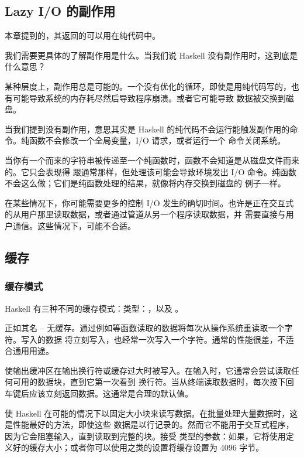 \documentclass[./main.tex]{subfiles}
\begin{document}
\subsection*{Lazy I/O 的副作用}

本章提到的，其返回的可以用在纯代码中。

我们需要更具体的了解副作用是什么。当我们说 Haskell 没有副作用时，这到底是什么意思？

某种层度上，副作用总是可能的。一个没有优化的循环，即使是用纯代码写的，也有可能导致系统的内存耗尽然后导致程序崩溃。或者它可能导致
数据被交换到磁盘。

当我们提到没有副作用，意思其实是 Haskell 的纯代码不会运行能触发副作用的命令。纯函数不会修改一个全局变量，I/O 请求，或者运行一个
命令关闭系统。

当你有一个而来的字符串被传递至一个纯函数时，函数不会知道是从磁盘文件而来的。它只会表现得
跟通常那样，但处理该可能会导致环境发出 I/O 命令。纯函数不会这么做；它们是纯函数处理的结果，就像将内存交换到磁盘的
例子一样。

在某些情况下，你可能需要更多的控制 I/O 发生的确切时间。也许是正在交互式的从用户那里读取数据，或者通过管道从另一个程序读取数据，并
需要直接与用户通信。这些情况下，可能不合适。

\subsection*{缓存}

\subsubsection*{缓存模式}

Haskell 有三种不同的缓存模式：类型：，以及
。

正如其名 -- 无缓存。通过例如等函数读取的数据将每次从操作系统重读取一个字符。写入的数据
将立刻写入，也经常一次写入一个字符。通常的性能很差，不适合通用用途。

使输出缓冲区在输出换行符或缓存过大时被写入。在输入时，它通常会尝试读取任何可用的数据块，直到它第一次看到
换行符。当从终端读取数据时，每次按下回车键后应该立刻返回数据。这通常是合理的默认值。

使 Haskell 在可能的情况下以固定大小块来读写数据。在批量处理大量数据时，这是性能最好的方法，即使这些
数据是以行记录的。然而它不能用于交互式程序，因为它会阻塞输入，直到读取到完整的块。接受
类型的参数：如果，它将使用定义好的缓存大小；或者你可以使用之类的设置将缓存设置为 4096
字节。
\end{document}
